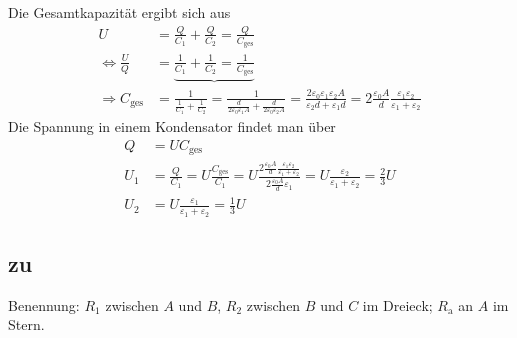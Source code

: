 \documentclass[a4paper]{scrartcl}
\begin{document}
\begin{enumerate}[noitemsep]
    Die Gesamtkapazität ergibt sich aus
    \begin{align*}
      U &= \frac{Q}{C_1} + \frac{Q}{C_2}  = \frac{Q}{C_\text{ges}}\\
      \Leftrightarrow \frac{U}{Q} &= \underbrace{\frac{1}{C_1} + \frac{1}{C_2}  = \frac{1}{C_\text{ges}}}\\
      \Rightarrow C_\text{ges} &= \frac{1}{\frac{1}{C_1}+\frac{1}{C_2}} = \frac{1}{\frac{d}{2\varepsilon_0\varepsilon_1A} + \frac{d}{2\varepsilon_0 \varepsilon_2 A}} = \frac{2 \varepsilon_0 \varepsilon_1 \varepsilon_2 A}{\varepsilon_2 d + \varepsilon_1 d} = 2 \frac{\varepsilon_0 A}{d} \frac{\varepsilon_1 \varepsilon_2}{\varepsilon_1 + \varepsilon_2}
    \end{align*}
    Die Spannung in einem Kondensator findet man über
    \begin{align*}
      Q &= U C_\text{ges} \\
      U_1 &= \frac{Q}{C_1} = U \frac{C_\text{ges}}{C_1} = U \frac{ 2 \frac{\varepsilon_0 A}{d} \frac{\varepsilon_1 \varepsilon_2}{\varepsilon_1 + \varepsilon_2}}{2\frac{\varepsilon_0 A}{d} \varepsilon_1} = U\frac{\varepsilon_2}{\varepsilon_1 + \varepsilon_2} = \frac{2}{3}U\\
      U_2 &= U \frac{\varepsilon_1}{\varepsilon_1 + \varepsilon_2} = \frac{1}{3}U
    \end{align*}

\end{enumerate}




\subsection{zu }
\label{lsg:Widerstaende}
Benennung: $R_1$ zwischen $A$ und $B$, $R_2$ zwischen $B$ und $C$ im Dreieck; $R_\text{a}$ an $A$ im Stern.
\end{document}
